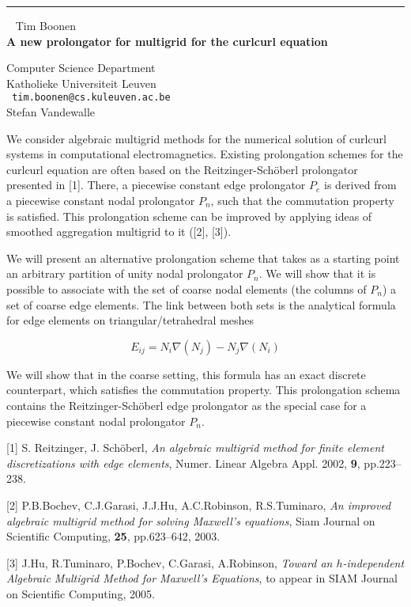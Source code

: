 \documentclass{report}
\begin{document}
\begin{center}

\rule{6in}{1pt} \
{\large
Tim Boonen
\\ {\bf
A new prolongator for multigrid for the curlcurl equation
}}

Computer Science Department
\\
Katholieke Universiteit Leuven
\\ {\tt
tim.boonen@cs.kuleuven.ac.be
}
\\
Stefan Vandewalle
\end{center}

We consider algebraic multigrid methods for the numerical solution of
curlcurl systems in computational electromagnetics. Existing
prolongation schemes for the curlcurl equation are often based on the
Reitzinger-Sch\"{o}berl prolongator presented in [1]. There, a
piecewise constant edge prolongator $P_e$ is derived from a piecewise
constant nodal prolongator $P_n$, such that the commutation property is
satisfied. This prolongation scheme can be improved by applying ideas
of smoothed aggregation multigrid to it ([2], [3]).

We will present an alternative prolongation scheme that takes as a
starting point an arbitrary partition of unity nodal prolongator $P_n$.
We will show that it is possible to associate with the set of coarse nodal
elements (the columns of $P_n$) a set of coarse edge elements. The link
between both sets is the analytical formula for edge elements on
triangular/tetrahedral meshes

$$ E_{ij} = N_i \nabla(N_j) - N_j \nabla(N_i)  $$

We will show that in the coarse setting, this formula has an exact
discrete counterpart, which satisfies the commutation property. This
prolongation schema contains the Reitzinger-Sch\"{o}berl edge
prolongator as the special case for a piecewise constant nodal
prolongator $P_n$.


[1] S. Reitzinger, J. Sch\"{o}berl, \emph{An algebraic multigrid method
for finite element discretizations with edge elements}, Numer. Linear
Algebra Appl. 2002, {\bf 9}, pp.223--238.

[2] P.B.Bochev, C.J.Garasi, J.J.Hu, A.C.Robinson, R.S.Tuminaro,
\emph{An
improved algebraic multigrid method for solving Maxwell's equations},
Siam Journal on Scientific Computing, {\bf 25}, pp.623--642, 2003.

[3] J.Hu, R.Tuminaro, P.Bochev, C.Garasi, A.Robinson, \emph{Toward an
$h$-independent Algebraic Multigrid Method for Maxwell's Equations},
to appear in SIAM Journal on Scientific Computing, 2005. 
\end{document}
